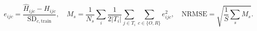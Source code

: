 \documentclass[12pt]{article}
\begin{document}
\fontsize{22}{28}\selectfont\[e_{ijc}=\frac{\widehat H_{ijc}-H_{ijc}}{\mathrm{SD}_{c,\mathrm{train}}},\quad M_s=\frac{1}{N_s}\sum_i\frac{1}{2|T_i|}\sum_{j\in T_i}\sum_{c\in\{O,R\}}e_{ijc}^2,\quad \mathrm{NRMSE}=\sqrt{\frac{1}{S}\sum_s M_s}.\]
\end{document}
